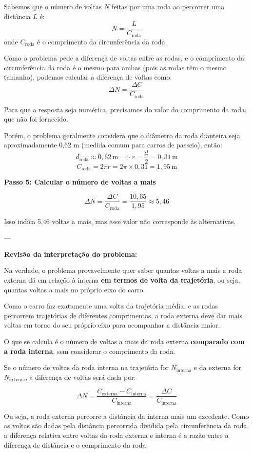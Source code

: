 \begin{flushleft}
Sabemos que o número de voltas $N$ feitas por uma roda ao percorrer uma distância $L$ é:
\[
N = \frac{L}{C_{\text{roda}}}
\]
onde $C_{\text{roda}}$ é o comprimento da circunferência da roda.

Como o problema pede a diferença de voltas entre as rodas, e o comprimento da circunferência da roda é o mesmo para ambas (pois as rodas têm o mesmo tamanho), podemos calcular a diferença de voltas como:
\[
\Delta N = \frac{\Delta C}{C_{\text{roda}}}
\]

Para que a resposta seja numérica, precisamos do valor do comprimento da roda, que não foi fornecido.

Porém, o problema geralmente considera que o diâmetro da roda dianteira seja aproximadamente 0,62 m (medida comum para carros de passeio), então:
\[
d_{\text{roda}} \approx 0,62\,\text{m} \implies r = \frac{d}{2} = 0,31\,\text{m}
\]
\[
C_{\text{roda}} = 2 \pi r = 2 \pi \times 0,31 = 1,95\,\text{m}
\]

\bigskip

\textbf{Passo 5: Calcular o número de voltas a mais}

\[
\Delta N = \frac{\Delta C}{C_{\text{roda}}} = \frac{10,65}{1,95} \approx 5,46
\]

Isso indica 5,46 voltas a mais, mas esse valor não corresponde às alternativas.

---

\textbf{Revisão da interpretação do problema:}

Na verdade, o problema provavelmente quer saber quantas voltas a mais a roda externa dá em relação à interna \textbf{em termos de volta da trajetória}, ou seja, quantas voltas a mais no próprio eixo do carro.

Como o carro faz exatamente uma volta da trajetória média, e as rodas percorrem trajetórias de diferentes comprimentos, a roda externa deve dar mais voltas em torno do seu próprio eixo para acompanhar a distância maior.

O que se calcula é o número de voltas a mais da roda externa \textbf{comparado com a roda interna}, sem considerar o comprimento da roda.

Se o número de voltas da roda interna na trajetória for $N_{\text{interna}}$ e da externa for $N_{\text{externa}}$, a diferença de voltas será dada por:

\[
\Delta N = \frac{C_{\text{externa}} - C_{\text{interna}}}{C_{\text{interna}}} = \frac{\Delta C}{C_{\text{interna}}}
\]

Ou seja, a roda externa percorre a distância da interna mais um excedente. Como as voltas são dadas pela distância percorrida dividida pela circunferência da roda, a diferença relativa entre voltas da roda externa e interna é a razão entre a diferença de distância e o comprimento da roda.


\end{flushleft}
